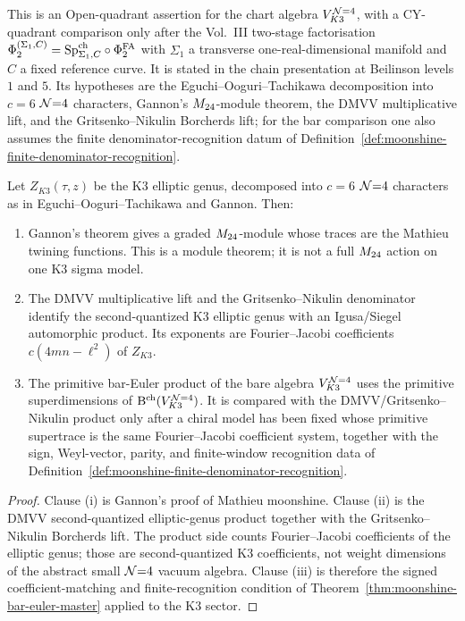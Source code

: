 \begin{theorem}
\label{thm:mathieu-class-from-N4-K3}
\ClaimStatusConditional
{}
This is an Open-quadrant assertion for the chart algebra $V_{K3}^{\mathcal N{=}4}$,
with a CY-quadrant comparison only after the Vol.~III two-stage
factorisation
$\Phi_2^{(\Sigma_1,C)}=\mathrm{Sp}^{\mathrm{ch}}_{\Sigma_1,C}\circ\Phi^{\mathrm{FA}}_2$ with
$\Sigma_1$ a transverse one-real-dimensional manifold and $C$ a
fixed reference curve. It is stated in the chain presentation at
Beilinson levels $1$ and $5$. Its hypotheses are the
Eguchi--Ooguri--Tachikawa decomposition into $c=6$ $\mathcal N{=}4$
characters, Gannon's $M_{24}$-module theorem, the DMVV multiplicative
lift, and the Gritsenko--Nikulin Borcherds lift; for the bar
comparison one also assumes the finite
denominator-recognition datum of
Definition~\ref{def:moonshine-finite-denominator-recognition}.

Let $Z_{K3}(\tau,z)$ be the K3 elliptic genus, decomposed into
$c=6$ $\mathcal N{=}4$ characters as in Eguchi--Ooguri--Tachikawa and
Gannon.  Then:
\begin{enumerate}[label=\textup{(\roman*)}]
\item Gannon's theorem gives a graded $M_{24}$-module whose traces are
the Mathieu twining functions.  This is a module theorem; it is not
a full $M_{24}$ action on one K3 sigma model.
\item The DMVV multiplicative lift and the
Gritsenko--Nikulin denominator identify the second-quantized K3
elliptic genus with an Igusa/Siegel automorphic product.  Its
exponents are Fourier--Jacobi coefficients
$c(4mn-\ell^2)$ of $Z_{K3}$.
\item The primitive bar-Euler product of the bare algebra
$V_{K3}^{\mathcal N{=}4}$ uses the primitive superdimensions of
$\mathrm B^{\mathrm{ch}}(V_{K3}^{\mathcal N{=}4})$.  It is compared with the DMVV/Gritsenko--Nikulin
product only after a chiral model has been fixed whose primitive
supertrace is the same Fourier--Jacobi coefficient system, together
with the sign, Weyl-vector, parity, and finite-window recognition data
of Definition~\ref{def:moonshine-finite-denominator-recognition}.
\end{enumerate}
\end{theorem}

\begin{proof}
Clause (i) is Gannon's proof of Mathieu moonshine.  Clause (ii) is
the DMVV second-quantized elliptic-genus product together with the
Gritsenko--Nikulin Borcherds lift.  The product side counts
Fourier--Jacobi coefficients of the elliptic genus; those are
second-quantized K3 coefficients, not weight dimensions of the
abstract small $\mathcal N{=}4$ vacuum algebra.  Clause (iii) is therefore
the signed coefficient-matching and finite-recognition condition of
Theorem~\ref{thm:moonshine-bar-euler-master} applied to the K3
sector.
\end{proof}

